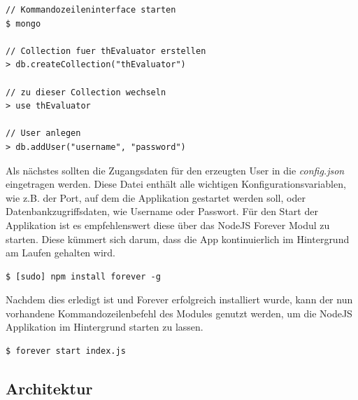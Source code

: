 \vspace{1cm}
\begin{lstlisting}[caption=Einrichten der Mongo Datenbank,label=initMongo]
// Kommandozeileninterface starten
$ mongo

// Collection fuer thEvaluator erstellen
> db.createCollection("thEvaluator")

// zu dieser Collection wechseln
> use thEvaluator

// User anlegen
> db.addUser("username", "password")
\end{lstlisting}
\vspace{1cm}

Als nächstes sollten die Zugangsdaten für den erzeugten User in die \textit{config.json} eingetragen werden. Diese Datei enthält alle wichtigen Konfigurationsvariablen, wie z.B. der Port, auf dem die Applikation gestartet werden soll, oder Datenbankzugriffsdaten, wie Username oder Passwort. Für den Start der Applikation ist es empfehlenswert diese über das NodeJS Forever Modul zu starten. Diese kümmert sich darum, dass die App kontinuierlich im Hintergrund am Laufen gehalten wird.

\vspace{1cm}
\begin{lstlisting}[caption=Installation von Forever auf dem Server,label=forever]
$ [sudo] npm install forever -g
\end{lstlisting}
\vspace{1cm}

Nachdem dies erledigt ist und Forever erfolgreich installiert wurde, kann der nun vorhandene Kommandozeilenbefehl des Modules genutzt werden, um die NodeJS Applikation im Hintergrund starten zu lassen.

\vspace{1cm}
\begin{lstlisting}[caption=Starten des API Services über den Forever-Befehl,label=forever]
$ forever start index.js
\end{lstlisting}

\subsection{Architektur}

